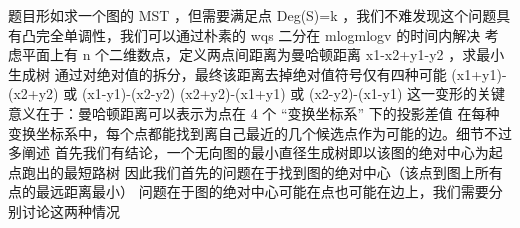\markdownRendererInterblockSeparator
{}题目形如求一个图的\markdownRendererDollarSign{} MST \markdownRendererDollarSign{}，但需要满足点\markdownRendererDollarSign{} Deg(S)=k \markdownRendererDollarSign{}，我们不难发现这个问题具有凸完全单调性，我们可以通过朴素的\markdownRendererDollarSign{} wqs \markdownRendererDollarSign{}二分在\markdownRendererDollarSign{} mlogmlogv \markdownRendererDollarSign{}的时间内解决\markdownRendererInterblockSeparator
{}
\markdownRendererSectionEnd \markdownRendererSectionBegin
{}\markdownRendererInterblockSeparator
{}考虑平面上有\markdownRendererDollarSign{} n \markdownRendererDollarSign{}个二维数点，定义两点间距离为曼哈顿距离\markdownRendererDollarSign{} \markdownRendererPipe{}x1-x2\markdownRendererPipe{}+\markdownRendererPipe{}y1-y2\markdownRendererPipe{} \markdownRendererDollarSign{}，求最小生成树\markdownRendererParagraphSeparator
{}通过对绝对值的拆分，最终该距离去掉绝对值符号仅有四种可能\markdownRendererParagraphSeparator
{}\markdownRendererDollarSign{} (x1+y1)-(x2+y2) \markdownRendererDollarSign{} 或\markdownRendererDollarSign{} (x1-y1)-(x2-y2) \markdownRendererDollarSign{}\markdownRendererParagraphSeparator
{}\markdownRendererDollarSign{} (x2+y2)-(x1+y1) \markdownRendererDollarSign{}或\markdownRendererDollarSign{} (x2-y2)-(x1-y1) \markdownRendererDollarSign{}\markdownRendererParagraphSeparator
{}这一变形的关键意义在于：曼哈顿距离可以表示为点在 4 个 “变换坐标系” 下的投影差值\markdownRendererParagraphSeparator
{}在每种变换坐标系中，每个点都能找到离自己最近的几个候选点作为可能的边。细节不过多阐述\markdownRendererInterblockSeparator
{}\markdownRendererInterblockSeparator
{}
\markdownRendererSectionEnd \markdownRendererSectionBegin
{}\markdownRendererInterblockSeparator
{}首先我们有结论，一个无向图的最小直径生成树即以该图的绝对中心为起点跑出的最短路树\markdownRendererParagraphSeparator
{}因此我们首先的问题在于找到图的绝对中心（该点到图上所有点的最远距离最小）\markdownRendererParagraphSeparator
{}问题在于图的绝对中心可能在点也可能在边上，我们需要分别讨论这两种情况\markdownRendererParagraphSeparator
